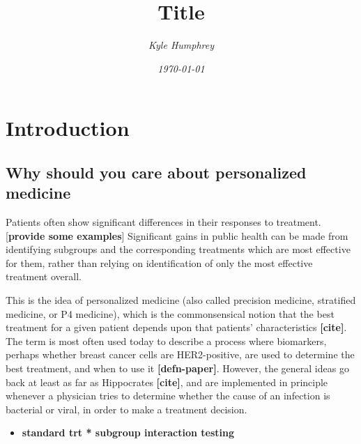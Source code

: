 \documentclass[12pt]{article}
\title{\normalfont \Large Title}
\author{\normalsize \sl Kyle Humphrey}
\date{\normalsize \sl \today}
\begin{document}
\maketitle

\section{Introduction}

\subsection{Why should you care about personalized medicine} %
\label{sub:why_should_you_care_about_personalized_medicine}



Patients often show significant differences in their responses to treatment. [\textbf{provide some examples}] Significant gains in public health can be made from identifying subgroups and the corresponding treatments which are most effective for them, rather than relying on identification of only the most effective treatment overall.

This is the idea of personalized medicine (also called precision medicine, stratified medicine, or P4 medicine), which is the commonsensical notion that the best treatment for a given patient depends upon that patients' characteristics \textbf{[cite]}. The term is most often used today to describe a process where biomarkers, perhaps whether breast cancer cells are HER2-positive, are used to determine the best treatment, and when to use it \textbf{[defn-paper]}.
However, the general ideas go back at least as far as Hippocrates \textbf{[cite]}, and are implemented in principle whenever a physician tries to determine whether the cause of an infection is bacterial or viral, in order to make a treatment decision.




\begin{itemize}
  \item \textbf{standard trt * subgroup interaction testing}
\end{itemize}

\end{document}
